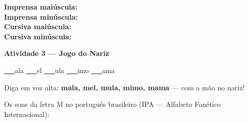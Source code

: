 \begin{consolidacao}
\begin{center}
\textbf{Imprensa mai\'uscula:} \underline{\hspace{1cm}} \underline{\hspace{1cm}} \underline{\hspace{1cm}} \underline{\hspace{1cm}} \underline{\hspace{1cm}}\\[0.5em]
\textbf{Imprensa min\'uscula:} \underline{\hspace{1cm}} \underline{\hspace{1cm}} \underline{\hspace{1cm}} \underline{\hspace{1cm}} \underline{\hspace{1cm}}\\[0.5em]
\textbf{Cursiva mai\'uscula:} \underline{\hspace{1cm}} \underline{\hspace{1cm}} \underline{\hspace{1cm}} \underline{\hspace{1cm}} \underline{\hspace{1cm}}\\[0.5em]
\textbf{Cursiva min\'uscula:} \underline{\hspace{1cm}} \underline{\hspace{1cm}} \underline{\hspace{1cm}} \underline{\hspace{1cm}} \underline{\hspace{1cm}}
\end{center}

\textbf{Atividade 3 --- Jogo do Nariz}


\begin{center}
\underline{~~~}ala \quad \underline{~~~}el \quad \underline{~~~}ula \quad \underline{~~~}imo \quad \underline{~~~}ama
\end{center}
Diga em voz alta: \textbf{mala, mel, mula, mimo, mama} --- com a m\~a{}o no nariz!

\end{consolidacao}


\begin{sonsdaletra}
Os sons da letra M no portugu\^es{} brasileiro (IPA --- Alfabeto Fon\'etico Internacional):

\end{sonsdaletra}

